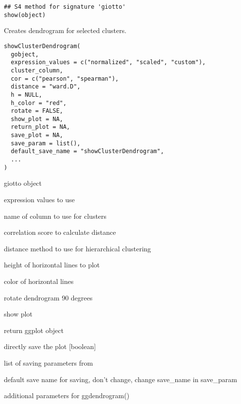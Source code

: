 \documentclass[a4paper]{book}
\begin{document}
%
\begin{Usage}
\begin{verbatim}
## S4 method for signature 'giotto'
show(object)
\end{verbatim}
\end{Usage}
%
\begin{Description}\relax
Creates dendrogram for selected clusters.
\end{Description}
%
\begin{Usage}
\begin{verbatim}
showClusterDendrogram(
  gobject,
  expression_values = c("normalized", "scaled", "custom"),
  cluster_column,
  cor = c("pearson", "spearman"),
  distance = "ward.D",
  h = NULL,
  h_color = "red",
  rotate = FALSE,
  show_plot = NA,
  return_plot = NA,
  save_plot = NA,
  save_param = list(),
  default_save_name = "showClusterDendrogram",
  ...
)
\end{verbatim}
\end{Usage}
%
\begin{Arguments}
\begin{ldescription}
\item[\code{gobject}] giotto object

\item[\code{expression\_values}] expression values to use

\item[\code{cluster\_column}] name of column to use for clusters

\item[\code{cor}] correlation score to calculate distance

\item[\code{distance}] distance method to use for hierarchical clustering

\item[\code{h}] height of horizontal lines to plot

\item[\code{h\_color}] color of horizontal lines

\item[\code{rotate}] rotate dendrogram 90 degrees

\item[\code{show\_plot}] show plot

\item[\code{return\_plot}] return ggplot object

\item[\code{save\_plot}] directly save the plot [boolean]

\item[\code{save\_param}] list of saving parameters from 

\item[\code{default\_save\_name}] default save name for saving, don't change, change save\_name in save\_param

\item[\code{...}] additional parameters for ggdendrogram()
\end{ldescription}
\end{Arguments}
\end{document}
